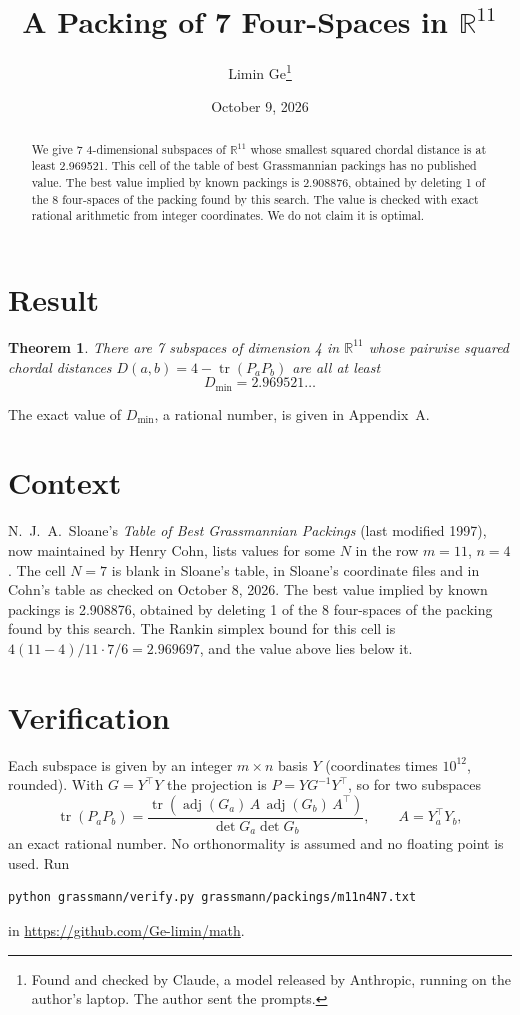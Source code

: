 \documentclass[11pt,a4paper]{article}
\title{A Packing of 7 Four-Spaces in $\mathbb{R}^{11}$}
\author{Limin Ge\thanks{Found and checked by Claude, a model released by Anthropic, running on the author's laptop. The author sent the prompts.}}
\date{October 9, 2026}
\newtheorem*{theorem}{Theorem}
\begin{document}
\maketitle
\begin{abstract}
We give 7 4-dimensional subspaces of $\mathbb{R}^{11}$ whose smallest squared chordal distance is at least 2.969521. This cell of the table of best Grassmannian packings has no published value. The best value implied by known packings is 2.908876, obtained by deleting 1 of the 8 four-spaces of the packing found by this search. The value is checked with exact rational arithmetic from integer coordinates. We do not claim it is optimal.
\end{abstract}

\section{Result}
\begin{theorem}
There are 7 subspaces of dimension 4 in $\mathbb{R}^{11}$ whose pairwise squared chordal distances $D(a,b) = 4 - \operatorname{tr}(P_aP_b)$ are all at least
\[ D_{\min} = 2.969521\ldots \]
\end{theorem}
The exact value of $D_{\min}$, a rational number, is given in Appendix~A.


\section{Context}
N.~J.~A.~Sloane's \emph{Table of Best Grassmannian Packings} (last modified 1997), now maintained by Henry Cohn, lists values for some $N$ in the row $m=11$, $n=4$. The cell $N=7$ is blank in Sloane's table, in Sloane's coordinate files and in Cohn's table as checked on October 8, 2026. The best value implied by known packings is 2.908876, obtained by deleting 1 of the 8 four-spaces of the packing found by this search. The Rankin simplex bound for this cell is $4(11-4)/11\cdot 7/6 = 2.969697$, and the value above lies below it.


\section{Verification}
Each subspace is given by an integer $m\times n$ basis $Y$ (coordinates times $10^{12}$, rounded). With $G=Y^\top Y$ the projection is $P=YG^{-1}Y^\top$, so for two subspaces
\[ \operatorname{tr}(P_aP_b)=\frac{\operatorname{tr}(\operatorname{adj}(G_a)\,A\,\operatorname{adj}(G_b)\,A^\top)}{\det G_a\det G_b},\qquad A=Y_a^\top Y_b, \]
an exact rational number. No orthonormality is assumed and no floating point is used. Run
\begin{verbatim}
python grassmann/verify.py grassmann/packings/m11n4N7.txt
\end{verbatim}
in \url{https://github.com/Ge-limin/math}.
\end{document}
